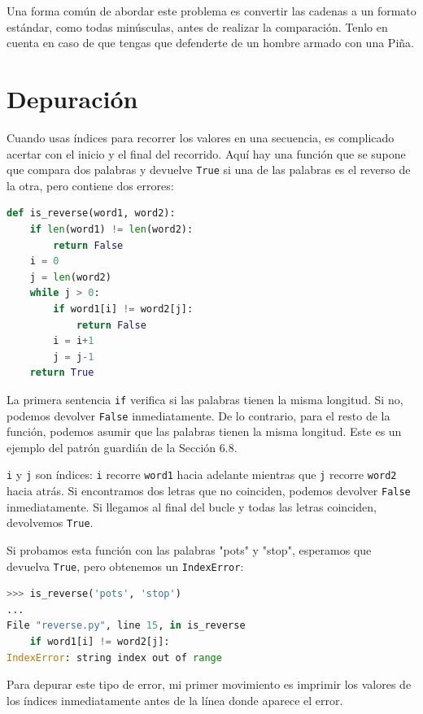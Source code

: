 Una forma común de abordar este problema es convertir las cadenas a un formato estándar, como todas minúsculas, antes de realizar la comparación. Tenlo en cuenta en caso de que tengas que defenderte de un hombre armado con una Piña.

\section{Depuración}

Cuando usas índices para recorrer los valores en una secuencia, es complicado acertar con el inicio y el final del recorrido. Aquí hay una función que se supone que compara dos palabras y devuelve \texttt{True} si una de las palabras es el reverso de la otra, pero contiene dos errores:

\begin{lstlisting}[language=Python]
def is_reverse(word1, word2):
    if len(word1) != len(word2):
        return False
    i = 0
    j = len(word2)
    while j > 0:
        if word1[i] != word2[j]:
            return False
        i = i+1
        j = j-1
    return True
\end{lstlisting}

La primera sentencia \texttt{if} verifica si las palabras tienen la misma longitud. Si no, podemos devolver \texttt{False} inmediatamente. De lo contrario, para el resto de la función, podemos asumir que las palabras tienen la misma longitud. Este es un ejemplo del patrón guardián de la Sección 6.8.

\texttt{i} y \texttt{j} son índices: \texttt{i} recorre \texttt{word1} hacia adelante mientras que \texttt{j} recorre \texttt{word2} hacia atrás. Si encontramos dos letras que no coinciden, podemos devolver \texttt{False} inmediatamente. Si llegamos al final del bucle y todas las letras coinciden, devolvemos \texttt{True}.

Si probamos esta función con las palabras "pots" y "stop", esperamos que devuelva \texttt{True}, pero obtenemos un \texttt{IndexError}:

\begin{lstlisting}[language=Python]
>>> is_reverse('pots', 'stop')
...
File "reverse.py", line 15, in is_reverse
    if word1[i] != word2[j]:
IndexError: string index out of range
\end{lstlisting}

Para depurar este tipo de error, mi primer movimiento es imprimir los valores de los índices inmediatamente antes de la línea donde aparece el error.

